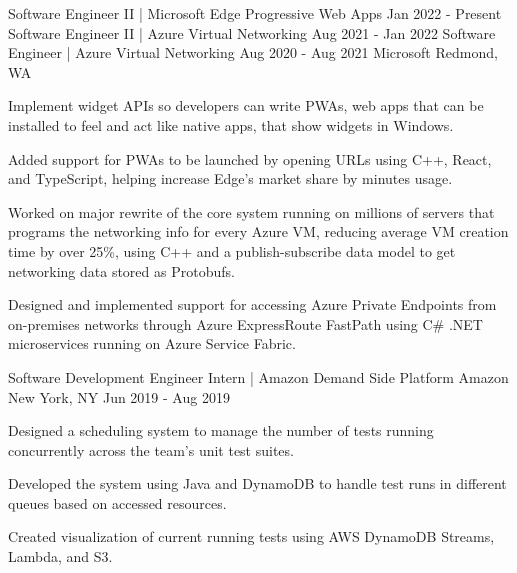 

\begin{cventries}

  \cventrythreepositions
  {Software Engineer II | Microsoft Edge Progressive Web Apps}
  {Jan 2022 - Present}
  {Software Engineer II | Azure Virtual Networking}
  {Aug 2021 - Jan 2022}
  {Software Engineer | Azure Virtual Networking}
  {Aug 2020 - Aug 2021}
  {Microsoft}
  {Redmond, WA}
  {
    \begin{cvitems} %
      \item {Implement widget APIs so developers can write PWAs, web apps that can be installed to feel and act like native apps, that show widgets in Windows.}
      \item {Added support for PWAs to be launched by opening URLs using C++, React, and TypeScript, helping increase Edge's market share by minutes usage.}
    \end{cvitems}
  }
  {
    \begin{cvitems} %
      \item {Worked on major rewrite of the core system running on millions of servers that programs the networking info for every Azure VM, reducing average VM creation time by over 25\%, using C++ and a publish-subscribe data model to get networking data stored as Protobufs.}
      \item {Designed and implemented support for accessing Azure Private Endpoints from on-premises networks through Azure ExpressRoute FastPath using C\# .NET microservices running on Azure Service Fabric.}
    \end{cvitems}
  }

  \cventry
  {Software Development Engineer Intern | Amazon Demand Side Platform} %
  {Amazon} %
  {New York, NY} %
  {Jun 2019 - Aug 2019} %
  {
    \begin{cvitems} %
      \item {Designed a scheduling system to manage the number of tests running concurrently across the team's unit test suites.}
      \item {Developed the system using Java and DynamoDB to handle test runs in different queues based on accessed resources.}
      \item {Created visualization of current running tests using AWS DynamoDB Streams, Lambda, and S3.}
    \end{cvitems}
  }


\end{cventries}
